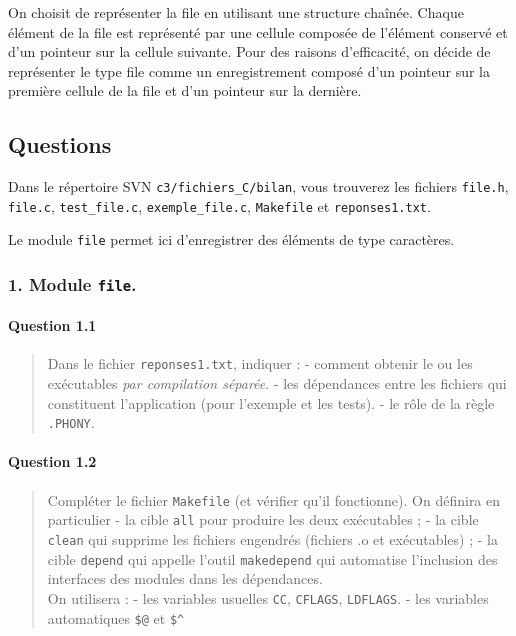 \documentclass[11pt]{article}
\begin{document}
On choisit de représenter la file en utilisant une structure chaînée.
Chaque élément de la file est représenté par une cellule composée de
l'élément conservé et d'un pointeur sur la cellule suivante. Pour des
raisons d'efficacité, on décide de représenter le type file comme un
enregistrement composé d'un pointeur sur la première cellule de la file
et d'un pointeur sur la dernière.

    \subsection{Questions}\label{questions}

Dans le répertoire SVN \texttt{c3/fichiers\_C/bilan}, vous trouverez les
fichiers \texttt{file.h}, \texttt{file.c}, \texttt{test\_file.c},
\texttt{exemple\_file.c}, \texttt{Makefile} et \texttt{reponses1.txt}.

Le module \texttt{file} permet ici d'enregistrer des éléments de type
caractères.

    \subsubsection{\texorpdfstring{1. Module
\texttt{file}.}{1. Module file.}}\label{module-file.}

\paragraph{Question 1.1}\label{question-1.1}

\begin{quote}
Dans le fichier \texttt{reponses1.txt}, indiquer : - comment obtenir le
ou les exécutables \emph{par compilation séparée}. - les dépendances
entre les fichiers qui constituent l'application (pour l'exemple et les
tests). - le rôle de la règle \texttt{.PHONY}.
\end{quote}

\paragraph{Question 1.2}\label{question-1.2}

\begin{quote}
Compléter le fichier \texttt{Makefile} (et vérifier qu'il fonctionne).
On définira en particulier - la cible \texttt{all} pour produire les
deux exécutables ; - la cible \texttt{clean} qui supprime les fichiers
engendrés (fichiers .o et exécutables) ; - la cible \texttt{depend} qui
appelle l'outil \texttt{makedepend} qui automatise l'inclusion des
interfaces des modules dans les dépendances.\\
On utilisera : - les variables usuelles \texttt{CC}, \texttt{CFLAGS},
\texttt{LDFLAGS}. - les variables automatiques \texttt{\$@} et
\texttt{\$\^{}}
\end{quote}
\end{document}
